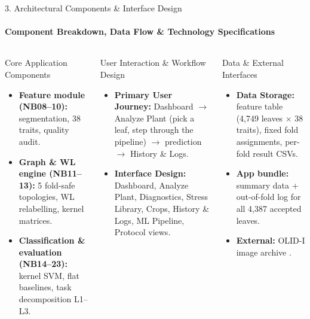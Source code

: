 \documentclass[aspectratio=169, 11pt]{beamer}
\begin{document}
\begin{frame}{3. Architectural Components \& Interface Design}
    \framesubtitle{Component Breakdown, Data Flow \& Technology Specifications}
    \begin{columns}[T]
        \begin{block}{Core Application Components}
            \scriptsize
            \begin{itemize}
                \item \textbf{Feature module (NB08--10):} segmentation, 38 traits, quality audit.
                \item \textbf{Graph \& WL engine (NB11--13):} 5 fold-safe topologies, WL relabelling, kernel matrices.
                \item \textbf{Classification \& evaluation (NB14--23):} kernel SVM, flat baselines, task decomposition L1--L3.
            \end{itemize}
        \end{block}

        \begin{block}{User Interaction \& Workflow Design}
            \scriptsize
            \begin{itemize}
                \item \textbf{Primary User Journey:} Dashboard $\rightarrow$ Analyze Plant (pick a leaf, step through the pipeline) $\rightarrow$ prediction $\rightarrow$ History \& Logs.
                \item \textbf{Interface Design:} Dashboard, Analyze Plant, Diagnostics, Stress Library, Crops, History \& Logs, ML Pipeline, Protocol views.
            \end{itemize}
        \end{block}

        \begin{block}{Data \& External Interfaces}
            \scriptsize
            \begin{itemize}
                \item \textbf{Data Storage:} feature table (4,749 leaves $\times$ 38 traits), fixed fold assignments, per-fold result CSVs.
                \item \textbf{App bundle:} summary data + out-of-fold log for all 4,387 accepted leaves.
                \item \textbf{External:} OLID-I image archive \cite{orka2023olid}.
            \end{itemize}
        \end{block}


\end{columns}
\end{frame}
\end{document}
